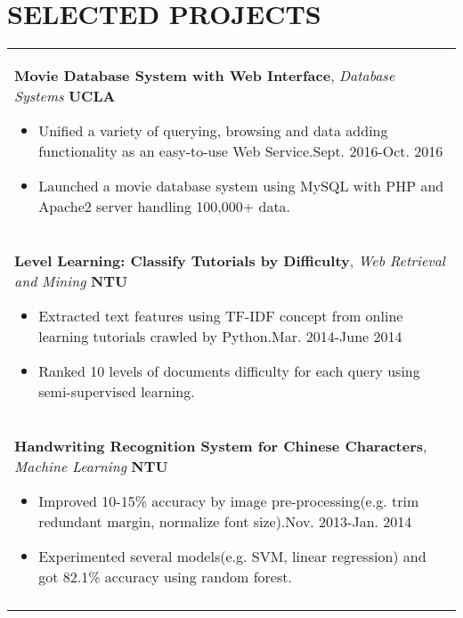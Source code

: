 \documentclass[a4paper,10pt]{article} %
\begin{document}
{%

\section{\textbf{SELECTED PROJECTS}}
\begin{tabular}{p{18.5cm}}

{\fontsize{11}{13.2}\textbf{Movie Database System with Web Interface}}, {\it{Database Systems}} \hfill \textbf{UCLA} 
\vspace{0.5mm}
\begin{itemize}
\item Unified a variety of querying, browsing and data adding functionality as an easy-to-use Web Service.\hfill Sept. 2016-Oct. 2016
\item Launched a movie database system using MySQL with PHP and Apache2 server handling 100,000+ data.\vspace*{-\baselineskip}
\end{itemize} \\
\vspace{0.5mm}

{\fontsize{11}{13.2}\textbf{Level Learning: Classify Tutorials by Difficulty}}, {\it{Web Retrieval and Mining}} \hfill \textbf{NTU} 
\vspace{0.5mm}
\begin{itemize}
\item Extracted text features using TF-IDF concept from online learning tutorials crawled by Python.\hfill Mar. 2014-June 2014
\item Ranked 10 levels of documents difficulty for each query using semi-supervised learning.\vspace*{-\baselineskip}
\end{itemize}\\
\vspace{0.5mm}

{\fontsize{11}{13.2}\textbf{Handwriting Recognition System for Chinese Characters}}, {\it{Machine Learning}} \hfill \textbf{NTU}  
\vspace{0.5mm}
\begin{itemize}
\item Improved 10-15\% accuracy by image pre-processing(e.g. trim redundant margin, normalize font size).\hfill  Nov. 2013-Jan. 2014
\item Experimented several models(e.g. SVM, linear regression) and got 82.1\% accuracy using random forest.\vspace*{-\baselineskip}
\end{itemize}\\
\vspace{0.5mm}


\end{tabular}}
\end{document}
